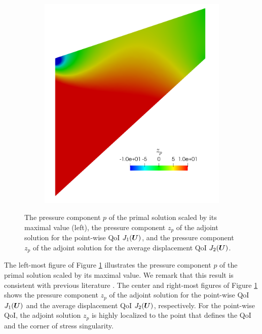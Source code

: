 \begin{figure}[ht!]
\begin{subfigure}{.33\textwidth}
\end{subfigure}
\begin{subfigure}{.33\textwidth}
\centering
\includegraphics[width=.9\linewidth]{img/mech_cooks_avg_u_zp.png}
\end{subfigure}
\caption{The pressure component $p$ of the primal solution scaled by its
maximal value (left), the pressure component $z_p$ of the adjoint solution for
the point-wise QoI $J_1(\boldsymbol{U})$, and the pressure component $z_p$ of the
adjoint solution for the average displacement QoI $J_2(\boldsymbol{U})$.}
\label{fig:mech_cooks_pressures}
\end{figure}

The left-most figure of Figure \ref{fig:mech_cooks_pressures} illustrates
the pressure component $p$ of the primal solution scaled by its maximal
value. We remark that this result is consistent with previous literature
\cite{ostien2016tet}. The center and right-most figures of Figure
\ref{fig:mech_cooks_pressures} shows the pressure component $z_p$ of the
adjoint solution for the point-wise QoI $J_1(\boldsymbol{U})$ and the average
displacement QoI $J_2(\boldsymbol{U})$, respectively. For the point-wise QoI, the
adjoint solution $z_p$ is highly localized to the point that defines the
QoI and the corner of stress singularity.


